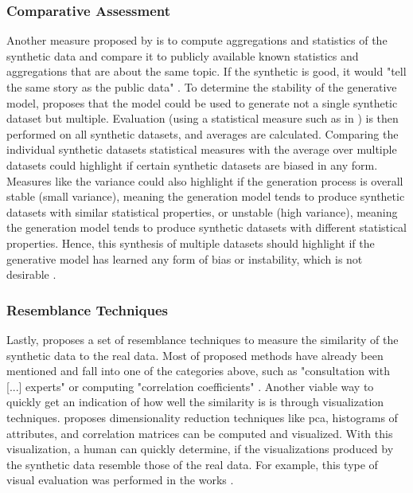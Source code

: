 \subsubsection{Comparative Assessment}
Another measure proposed by \cite{elemam2020SevenWaysEvaluate} is to compute aggregations and statistics of the synthetic data and compare it to publicly available known statistics and aggregations that are about the same topic.
If the synthetic is good, it would "tell the same story as the public data" \cite[p. 58]{elemam2020SevenWaysEvaluate}.
To determine the stability of the generative model, \textcite{elemam2020SevenWaysEvaluate} proposes that the model could be used to generate not a single synthetic dataset but multiple.
Evaluation (\eg using a statistical measure such as in ) is then performed on all synthetic datasets, and averages are calculated.
Comparing the individual synthetic datasets statistical measures with the average over multiple datasets could highlight if certain synthetic datasets are biased in any form.
Measures like the variance could also highlight if the generation process is overall stable (small variance), meaning the generation model tends to produce synthetic datasets with similar statistical properties, 
or unstable (high variance), meaning the generation model tends to produce synthetic datasets with different statistical properties. 
Hence, this synthesis of multiple datasets should highlight if the generative model has learned any form of bias or instability, which is not desirable \cite{elemam2020SevenWaysEvaluate}.

\subsubsection{Resemblance Techniques}
Lastly, \cite{hernandez2022SyntheticDataGeneration} proposes a set of resemblance techniques to measure the similarity of the synthetic data to the real data.
Most of \cite{hernandez2022SyntheticDataGeneration} proposed methods have already been mentioned and fall into one of the categories above, such as "consultation with [...] experts" or computing "correlation coefficients" \cite{hernandez2022SyntheticDataGeneration}.
Another viable way to quickly get an indication of how well the similarity is is through visualization techniques.
\textcite{hernandez2022SyntheticDataGeneration} proposes dimensionality reduction techniques like \gls{pca}, histograms of attributes, and correlation matrices can be computed and visualized.
With this visualization, a human can quickly determine, if the visualizations produced by the synthetic data resemble those of the real data.
For example, this type of visual evaluation was performed in the works \textcite{li2022TTSGANTransformerbasedTimeSeries, leminh2021AirGenGANbasedSynthetica, mckeever2020SynthesisingTabularDatasets}.


